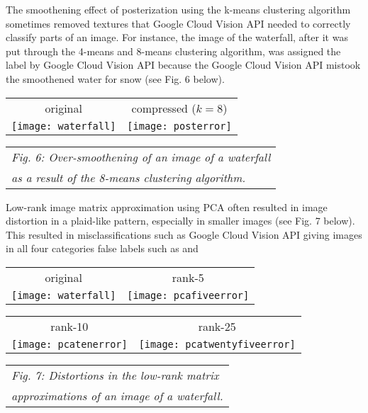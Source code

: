 \documentclass[letterpaper, 12 pt, conference]{ieeeconf}  %
\begin{document}
The smoothening effect of posterization using the k-means clustering
algorithm sometimes removed textures that Google Cloud Vision API
needed to correctly classify parts of an image. For instance,
the image of the waterfall, after it was put through the
4-means and 8-means clustering algorithm, was assigned the label 
by Google Cloud Vision API because the Google Cloud Vision API mistook
the smoothened water for snow (see Fig. 6 below).

\vspace*{3mm}
\begin{tabular}{c c}
	original & compressed ($k=8$) \\
	\texttt{[image: waterfall]} &
		\texttt{[image: posterror]} \\
\end{tabular}
\begin{tabular}{l}
	\hspace*{4mm} {\it Fig. 6: Over-smoothening of an image of a waterfall} \\
	\hspace*{4mm} {\it as a result of the 8-means clustering algorithm.} \\
\end{tabular}
\vspace*{3mm}

Low-rank image matrix approximation using PCA often resulted in
image distortion in a plaid-like pattern, especially in smaller
images (see Fig. 7 below). This resulted in misclassifications
such as Google Cloud Vision API giving images in all four categories
false labels such as  
and 

\vspace*{3mm}
\begin{tabular}{c c}
	original & rank-5 \\
	\texttt{[image: waterfall]} &
		\texttt{[image: pcafiveerror]} \\
\end{tabular}

\begin{tabular}{c c}
	rank-10 & rank-25 \\
	\texttt{[image: pcatenerror]} &
		\texttt{[image: pcatwentyfiveerror]} \\
\end{tabular}
\begin{tabular}{l}
	\hspace*{4mm} {\it Fig. 7: Distortions in the low-rank matrix } \\
	\hspace*{4mm} {\it approximations of an image of a waterfall.} \\
\end{tabular}
\vspace*{3mm}
\end{document}
